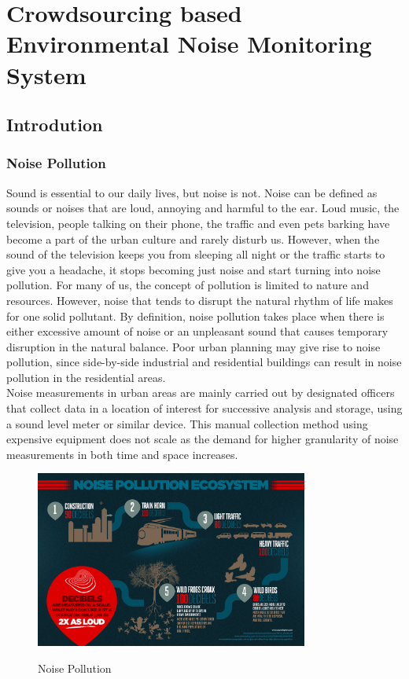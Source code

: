 \chapter{Crowdsourcing based Environmental Noise Monitoring System}

\section{Introdution}




\subsection{Noise Pollution}

Sound is essential to our daily lives, but noise is not. Noise can be defined as sounds or noises that are loud, annoying and harmful to the ear.  Loud music, the television, people talking on their phone, the traffic and even pets barking have become a part of the urban culture and rarely disturb us. However, when the sound of the television keeps you from sleeping all night or the traffic starts to give you a headache, it stops becoming just noise and start turning into noise pollution. For many of us, the concept of pollution is limited to nature and resources. However, noise that tends to disrupt the natural rhythm of life makes for one solid pollutant. By definition, noise pollution takes place when there is either excessive amount of noise or an unpleasant sound that causes temporary disruption in the natural balance. Poor urban planning may give rise to noise pollution, since side-by-side industrial and residential buildings can result in noise pollution in the residential areas. 
\\
Noise measurements in urban areas are mainly carried out by designated officers that collect data in a location of interest for successive analysis and storage, using a sound level meter or similar device. This manual collection method using expensive equipment does not scale as the demand for higher granularity of noise measurements in both time and space increases.

\begin{figure}[!htbp]
	\includegraphics[width=0.8\textwidth]{1.jpg}
	\centering
	\label{fig:Noise Polution}
	\caption{Noise Pollution}
\end{figure}

